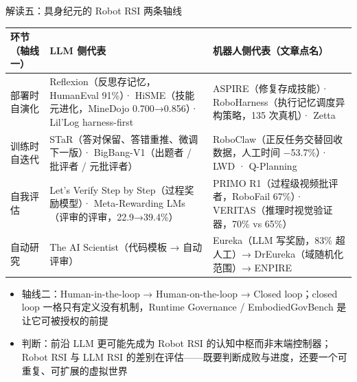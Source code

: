 \documentclass[aspectratio=169,10pt]{beamer}
\newcommand{\con}[1]{\textcolor{negative}{#1}}
\newcommand{\HL}[1]{\textcolor{emphasis}{#1}}
\begin{document}
\begin{frame}{解读五：具身纪元的 Robot RSI 两条轴线}
\begin{center}
\vspace{2pt}
\scriptsize
\begin{tabular}{@{}p{2.4cm}p{5.0cm}p{5.6cm}@{}}
\toprule
环节（轴线一） & LLM 侧代表 & 机器人侧代表（文章点名） \\
\midrule
部署时自演化 & Reflexion（反思存记忆，HumanEval 91\%）· HiSME（技能元进化，MineDojo 0.700→0.856）· Lil'Log harness-first & ASPIRE（修复存成技能）· RoboHarness（执行记忆调度异构策略，135 次真机）· Zetta \\
训练时自迭代 & STaR（答对保留、答错重推、微调下一版）· BigBang-V1（出题者 / 批评者 / 元批评者） & RoboClaw（正反任务交替回收数据，人工时间 $-$53.7\%）· LWD · Q-Planning \\
自我评估 & Let's Verify Step by Step（过程奖励模型）· Meta-Rewarding LMs（评审的评审，22.9→39.4\%） & PRIMO R1（过程级视频批评者，RoboFail 67\%）· VERITAS（推理时视觉验证器，70\% vs 65\%） \\
自动研究 & The AI Scientist（代码模板 → 自动评审） & Eureka（LLM 写奖励，83\% 超人工）→ DrEureka（域随机化范围）→ ENPIRE \\
\bottomrule
\end{tabular}
\end{center}
\begin{itemize}
  \item 轴线二：Human-in-the-loop → Human-on-the-loop → Closed loop；\con{closed loop 一格只有定义没有机制}，Runtime Governance / EmbodiedGovBench 是让它可被授权的前提
  \item 判断：前沿 LLM 更可能先成为 Robot RSI 的\HL{认知中枢}而非末端控制器；Robot RSI 与 LLM RSI 的差别在评估——既要判断成败与进度，还要一个可重复、可扩展的虚拟世界
\end{itemize}
\end{frame}
\end{document}
